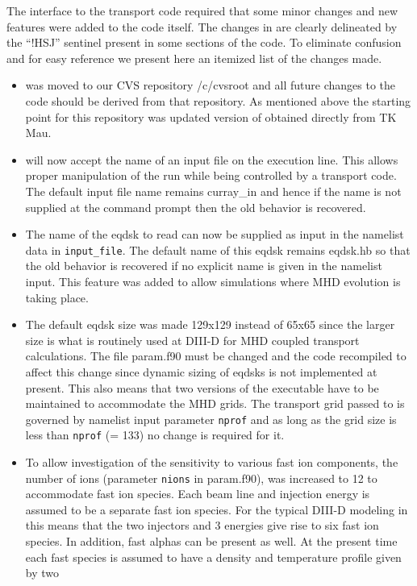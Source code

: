  The interface to the \ot transport code required that
some minor changes and new features were added to the \ct code  itself. 
The changes in \ct are clearly delineated by the ``!HSJ''
sentinel  present in some sections of the code.
To eliminate confusion and for easy reference we present here an itemized
list of the changes made. 
\begin {itemize}
 \item \ct was moved to our CVS repository /c/cvsroot and
 all future changes to the code should be derived from that
 repository. As mentioned above the starting point for this repository
 was updated version of \ct obtained directly from TK Mau. 
 \item \ct  will now accept the name of an input file
 on the execution line. This allows proper manipulation of the \ct run
 while being controlled by a transport code.
 The default input file name remains  curray\_in and hence
 if the name is not supplied at the command prompt then the old
 behavior is recovered.
 \item The name of the eqdsk to read can now be supplied as
 input in the namelist data in \texttt{input\_file}. The default name
 of this eqdsk remains eqdsk.hb so that the old behavior is
 recovered if no explicit name is given in the namelist input.
 This feature was added to allow simulations where MHD evolution is
 taking place.
 \item The default eqdsk size was made 129x129 instead of 65x65  since the
 larger size is what is routinely used at DIII-D for MHD coupled transport
 calculations. The file param.f90 must be changed and the code recompiled to
 affect this change since dynamic sizing of eqdsks is not implemented at
 present. This also means that two versions of the \ct executable have to be
 maintained to accommodate the MHD grids. The transport grid passed to \ct is
 governed by namelist input parameter \texttt{nprof} and as long  as the grid
 size is less than \texttt{nprof} (= 133) no change  is required for it. 
 \item To allow investigation of  the sensitivity to various fast ion components,
 the number of ions (parameter \texttt{nions} in param.f90), was increased to 12
 to accommodate fast ion species. Each beam line and injection energy is assumed
 to be a separate fast ion species. For the typical DIII-D modeling in \ot this
 means that the two injectors and 3 energies give rise to six fast ion species.
 In addition, fast alphas can be present as well.  At the present time each fast
 species is assumed to have a density and temperature profile given by two

\end{itemize}
